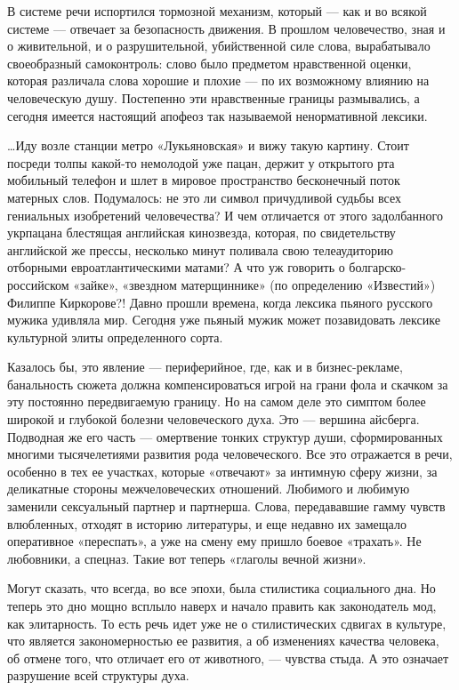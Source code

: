В системе речи испортился тормозной механизм, который — как и во всякой системе
— отвечает за безопасность движения. В прошлом человечество, зная и о
живительной, и о разрушительной, убийственной силе слова, вырабатывало
своеобразный самоконтроль: слово было предметом нравственной оценки, которая
различала слова хорошие и плохие — по их возможному влиянию на человеческую
душу. Постепенно эти нравственные границы размывались, а сегодня имеется
настоящий апофеоз так называемой ненормативной лексики.

…Иду возле станции метро «Лукьяновская» и вижу такую картину. Стоит посреди
толпы какой-то немолодой уже пацан, держит у открытого рта мобильный телефон и
шлет в мировое пространство бесконечный поток матерных слов. Подумалось: не это
ли символ причудливой судьбы всех гениальных изобретений человечества? И чем
отличается от этого задолбанного укрпацана блестящая английская кинозвезда,
которая, по свидетельству английской же прессы, несколько минут поливала свою
телеаудиторию отборными евроатлантическими матами? А что уж говорить о
болгарско-российском «зайке», «звездном матерщиннике» (по определению
«Известий») Филиппе Киркорове?! Давно прошли времена, когда лексика пьяного
русского мужика удивляла мир. Сегодня уже пьяный мужик может позавидовать
лексике культурной элиты определенного сорта.

Казалось бы, это явление — периферийное, где, как и в бизнес-рекламе,
банальность сюжета должна компенсироваться игрой на грани фола и скачком за эту
постоянно передвигаемую границу. Но на самом деле это симптом более широкой и
глубокой болезни человеческого духа. Это — вершина айсберга. Подводная же его
часть — омертвение тонких структур души, сформированных многими тысячелетиями
развития рода человеческого. Все это отражается в речи, особенно в тех ее
участках, которые «отвечают» за интимную сферу жизни, за деликатные стороны
межчеловеческих отношений. Любимого и любимую заменили сексуальный партнер и
партнерша. Слова, передававшие гамму чувств влюбленных, отходят в историю
литературы, и еще недавно их замещало оперативное «переспать», а уже на смену
ему пришло боевое «трахать». Не любовники, а спецназ. Такие вот теперь «глаголы
вечной жизни».

Могут сказать, что всегда, во все эпохи, была стилистика социального дна. Но
теперь это дно мощно всплыло наверх и начало править как законодатель мод, как
элитарность. То есть речь идет уже не о стилистических сдвигах в культуре, что
является закономерностью ее развития, а об изменениях качества человека, об
отмене того, что отличает его от животного, — чувства стыда. А это означает
разрушение всей структуры духа.

